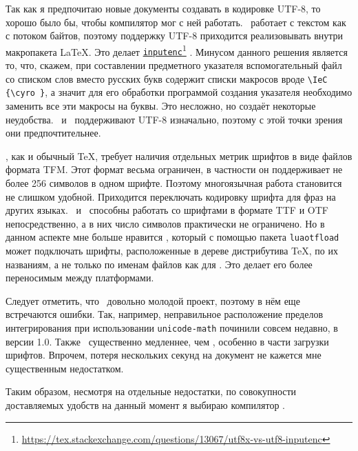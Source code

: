 \documentclass[a4paper,12pt]{article}
\newcommand\foothref[2]{%
  \href{#1}{#2}\footnote{\url{#1}}%
}
\newcommand\package[1]{\texttt{#1}}
\begin{document}
Так как я предпочитаю новые документы создавать в кодировке UTF-8, то хорошо было
бы, чтобы компилятор мог с ней работать. \pdfTeX\ работает с текстом как с потоком
байтов, поэтому поддержку UTF-8 приходится реализовывать внутри макропакета \LaTeX.
Это делает
\foothref{https://tex.stackexchange.com/questions/13067/utf8x-vs-utf8-inputenc}{\package{inputenc}}.
Минусом данного решения является то, что, скажем,
при составлении предметного указателя вспомогательный файл со списком слов
вместо русских букв содержит списки макросов вроде \verb|\IeC {\cyro }|,
а значит для его обработки программой создания указателя необходимо заменить
все эти макросы на буквы. Это несложно, но создаёт некоторые неудобства.
\XeTeX\ и \LuaTeX\ поддерживают UTF-8 изначально, поэтому с этой точки зрения
они предпочтительнее.

\pdfTeX, как и обычный \TeX, требует наличия отдельных метрик шрифтов в виде
файлов формата TFM. Этот формат весьма ограничен, в частности он поддерживает не
более 256 символов в одном шрифте. Поэтому многоязычная работа становится не
слишком удобной. Приходится переключать кодировку шрифта для фраз на других
языках. \XeTeX\ и \LuaTeX\ способны работать со шрифтами в формате TTF и OTF
непосредственно, а в них число символов практически не ограничено. Но в
данном аспекте мне больше нравится \LuaTeX, который с помощью пакета
\package{luaotfload} может подключать шрифты, расположенные в дереве
дистрибутива \TeX, по их названиям, а не только по
именам файлов как для \XeTeX. Это делает его более переносимым между
платформами.

Следует отметить, что \LuaTeX\ довольно молодой проект, поэтому в нём еще
встречаются ошибки. Так, например, неправильное расположение пределов
интегрирования при использовании \package{unicode-math} починили совсем недавно,
в версии 1.0. Также \LuaTeX\ существенно медленнее, чем \pdfTeX, особенно в части
загрузки шрифтов. Впрочем, потеря нескольких секунд на документ не кажется мне
существенным недостатком.

Таким образом, несмотря на отдельные недостатки, по совокупности доставляемых
удобств на данный момент я выбираю компилятор \LuaTeX.
\end{document}
